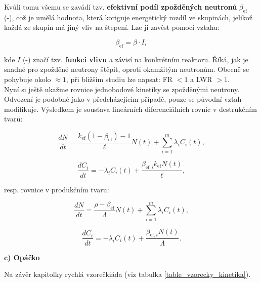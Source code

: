 Kvůli tomu všemu se zavádí tzv. \textbf{efektivní podíl zpožděných neutronů} $\beta_{\text{ef}}$ (-), což je umělá hodnota, která koriguje energetický rozdíl ve skupinách, jelikož každá ze skupin má jiný vliv na štepení. Lze ji zavést pomocí vztahu:

\begin{equation}
  \beta_{\text{ef}} = \beta \cdot I,
\end{equation}

kde $I$ (-) značí tzv. \textbf{funkci vlivu} a závisí na konkrétním reaktoru. Říká, jak je snadné pro zpožděné neutrony štěpit, oproti okamžitým neutronům. Obecně se pohybuje okolo $\approx 1$, při bližším studiu lze napsat: FR $<1$ a LWR $>1$.\\

Nyní si ještě ukažme rovnice jednobodové kinetiky se zpožděnými neutrony. Odvození je podobné jako v předcházejícím případě, pouze se původní vztah modifikuje. Výsledkem je soustava lineárních diferenciálních rovnic v destrukčním tvaru:

\begin{equation}
  \boxed{
  \dfrac{dN}{dt} = \dfrac{k_{\text{ef}}(1-\beta_{\text{ef}})-1}{\ell} N(t) + \sum_{i=1}^m \lambda_i C_i(t),
  \label{rovnice_kinetiky_zpozdenky_1}}
\end{equation}

\begin{equation}
  \boxed{
  \dfrac{dC_i}{dt} = -\lambda_i C_i(t) + \dfrac{\beta_{\text{ef},i} k_{\text{ef}} N(t)}{\ell},
  \label{rovnice_kinetiky_zpozdenky_2}}
\end{equation}

resp. rovnice v produkčním tvaru:

\begin{equation}
  \boxed{
  \dfrac{dN}{dt} = \dfrac{\rho - \beta_{\text{ef}}}{\Lambda} N(t) + \sum_{i=1}^m \lambda_i C_i(t),
  \label{rovnice_kinetiky_zpozdenky_3}}
\end{equation}

\begin{equation}
  \boxed{
  \dfrac{dC_i}{dt} = -\lambda_i C_i(t) + \dfrac{\beta_{\text{ef},i}  N(t)}{\Lambda}.
  \label{rovnice_kinetiky_zpozdenky_4}}
\end{equation}

\textbf{c) Opáčko}

Na závěr kapitolky rychlá vzorečkiáda (viz tabulka \ref{table_vzorecky_kinetika}).

